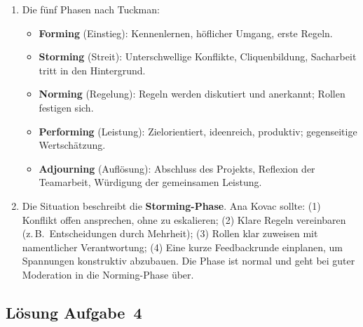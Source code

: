 \documentclass[11pt, a4paper]{article}
\begin{document}
\begin{enumerate}[label=(\alph*)]
  \item Die fünf Phasen nach Tuckman:
  \begin{itemize}
    \item \textbf{Forming} (Einstieg): Kennenlernen, höflicher Umgang, erste Regeln.
    \item \textbf{Storming} (Streit): Unterschwellige Konflikte, Cliquenbildung, Sacharbeit tritt in den Hintergrund.
    \item \textbf{Norming} (Regelung): Regeln werden diskutiert und anerkannt; Rollen festigen sich.
    \item \textbf{Performing} (Leistung): Zielorientiert, ideen­reich, produktiv; gegenseitige Wertschätzung.
    \item \textbf{Adjourning} (Auflösung): Abschluss des Projekts, Reflexion der Teamarbeit, Würdigung der gemeinsamen Leistung.
  \end{itemize}

  \item Die Situation beschreibt die \textbf{Storming-Phase}. Ana Kovac sollte: (1) Konflikt offen ansprechen, ohne zu eskalieren; (2) Klare Regeln vereinbaren (z.\,B.\ Entscheidungen durch Mehrheit); (3) Rollen klar zuweisen mit namentlicher Verantwortung; (4) Eine kurze Feedbackrunde einplanen, um Spannungen konstruktiv abzubauen. Die Phase ist normal und geht bei guter Moderation in die Norming-Phase über.
\end{enumerate}

\subsection*{Lösung Aufgabe~4}
\end{document}
